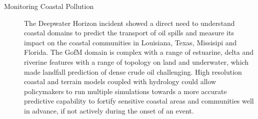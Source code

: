 \begin{description}
\item[Monitoring Coastal Pollution] The Deepwater Horizon incident
  showed a direct need to understand coastal domains to predict the
  transport of oil spills and measure its impact on the coastal
  communities in Louisiana, Texas, Missisipi and Florida. The GofM
  domain is complex with a range of estuarine, delta and riverine
  features with a range of topology on land and underwater, which made
  landfall prediction of dense crude oil challenging. High resolution
  coastal and terrain models coupled with hydrology could allow
  policymakers to run multiple simulations towards a more accurate
  predictive capability to fortify sensitive coastal areas and
  communities well in advance, if not actively during the onset of an
  event.

\end{description}  